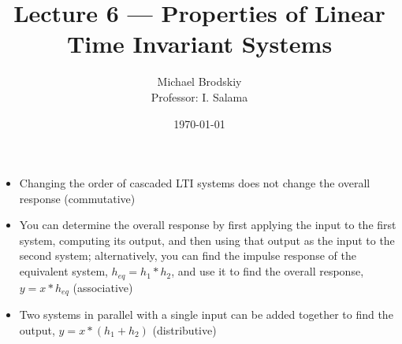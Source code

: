 


\title{Lecture 6 — Properties of Linear Time Invariant Systems}
\date{\today}
\author{Michael Brodskiy\\ \small Professor: I. Salama}



\maketitle

\begin{itemize}

  \item Changing the order of cascaded LTI systems does not change the overall response (commutative)

  \item You can determine the overall response by first applying the input to the first system, computing its output, and then using that output as the input to the second system; alternatively, you can find the impulse response of the equivalent system, $h_{eq}=h_1*h_2$, and use it to find the overall response, $y=x*h_{eq}$ (associative)

  \item Two systems in parallel with a single input can be added together to find the output, $y=x*(h_1+h_2)$ (distributive)

\end{itemize}



